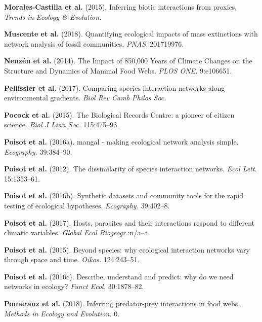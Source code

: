 \leavevmode\hypertarget{ref-MoraMati15}{}%
\textbf{Morales-Castilla et al.} (2015). Inferring biotic interactions
from proxies. \emph{Trends in Ecology \& Evolution.}

\leavevmode\hypertarget{ref-MuscPrab18}{}%
\textbf{Muscente et al.} (2018). Quantifying ecological impacts of mass
extinctions with network analysis of fossil communities.
\emph{PNAS.}:201719976.

\leavevmode\hypertarget{ref-NenzMont14}{}%
\textbf{Nenzén et al.} (2014). The Impact of 850,000 Years of Climate
Changes on the Structure and Dynamics of Mammal Food Webs. \emph{PLOS
ONE.} 9:e106651.

\leavevmode\hypertarget{ref-PellAlbo17}{}%
\textbf{Pellissier et al.} (2017). Comparing species interaction
networks along environmental gradients. \emph{Biol Rev Camb Philos Soc.}

\leavevmode\hypertarget{ref-PocoRoy15}{}%
\textbf{Pocock et al.} (2015). The Biological Records Centre: a pioneer
of citizen science. \emph{Biol J Linn Soc.} 115:475--93.

\leavevmode\hypertarget{ref-PoisBais16}{}%
\textbf{Poisot et al.} (2016a). mangal - making ecological network
analysis simple. \emph{Ecography.} 39:384--90.

\leavevmode\hypertarget{ref-PoisCana12}{}%
\textbf{Poisot et al.} (2012). The dissimilarity of species interaction
networks. \emph{Ecol Lett.} 15:1353--61.

\leavevmode\hypertarget{ref-PoisGrav16}{}%
\textbf{Poisot et al.} (2016b). Synthetic datasets and community tools
for the rapid testing of ecological hypotheses. \emph{Ecography.}
39:402--8.

\leavevmode\hypertarget{ref-PoisGuev17}{}%
\textbf{Poisot et al.} (2017). Hosts, parasites and their interactions
respond to different climatic variables. \emph{Global Ecol
Biogeogr.}:n/a--a.

\leavevmode\hypertarget{ref-PoisStou15}{}%
\textbf{Poisot et al.} (2015). Beyond species: why ecological
interaction networks vary through space and time. \emph{Oikos.}
124:243--51.

\leavevmode\hypertarget{ref-PoisStou16}{}%
\textbf{Poisot et al.} (2016c). Describe, understand and predict: why do
we need networks in ecology? \emph{Funct Ecol.} 30:1878--82.

\leavevmode\hypertarget{ref-PomeThom18}{}%
\textbf{Pomeranz et al.} (2018). Inferring predator-prey interactions in
food webs. \emph{Methods in Ecology and Evolution.} 0.

